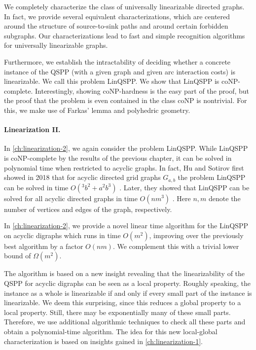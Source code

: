 We completely characterize the class of universally linearizable directed graphs.
In fact, we provide several equivalent characterizations, which are centered around the structure of source-to-sink paths and around certain forbidden subgraphs. Our characterizations lead to fast and simple recognition algorithms for universally linearizable graphs. 

Furthermore, we establish the intractability of deciding whether a concrete instance of the QSPP (with a given graph and given arc interaction costs) is linearizable. We call this problem LinQSPP. We show that LinQSPP is coNP-complete. Interestingly, showing coNP-hardness is the easy part of the proof, but the proof that the problem is even contained in the class coNP is nontrivial. For this, we make use of Farkas' lemma \cite{Farkas1902} and polyhedric geometry.


\paragraph*{Linearization II.}
In \cref{ch:linearization-2}, we again consider the problem LinQSPP.
While LinQSPP is coNP-complete by the results of the previous chapter, it can be solved in polynomial time when restricted to acyclic graphs.
In fact, Hu and Sotirov first showed in 2018 that for acyclic directed grid graphs $G_{a,b}$ the problem LinQSPP can be solved in time $O(^3b^2 + a^2b^3)$ \cite{huSo2018}. Later, they showed that LinQSPP can be solved for all acyclic directed graphs in time $O(nm^3)$ \cite{huSo2021}. Here $n,m$ denote the number of vertices and edges of the graph, respectively.

In \cref{ch:linearization-2}, we provide a novel linear time algorithm for the LinQSPP on acyclic digraphs which runs in time $O(m^2)$, improving over the previously best algorithm by a factor $O(nm)$. We complement this with a trivial lower bound of $\Omega(m^2)$.

The algorithm is based on a new insight revealing that the linearizability of the QSPP for acyclic digraphs can be seen as a local property. Roughly speaking, the instance as a whole is linearizable if and only if every small part of the instance is linearizable. We deem this surprising, since this reduces a global property to a local property. Still, there may be exponentially many of these small parts. Therefore, we use additional algorithmic techniques to check all these parts and obtain a polynomial-time algorithm. The idea for this new local-global characterization is based on insights gained in \cref{ch:linearization-1}.


